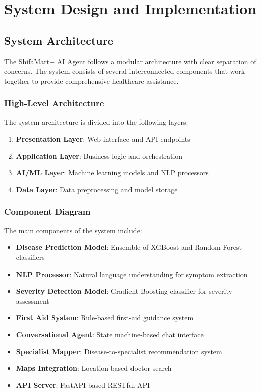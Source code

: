 \chapter{System Design and Implementation}

\section{System Architecture}
The ShifaMart+ AI Agent follows a modular architecture with clear separation of concerns. The system consists of several interconnected components that work together to provide comprehensive healthcare assistance.

\subsection{High-Level Architecture}
The system architecture is divided into the following layers:

\begin{enumerate}
    \item \textbf{Presentation Layer}: Web interface and API endpoints
    \item \textbf{Application Layer}: Business logic and orchestration
    \item \textbf{AI/ML Layer}: Machine learning models and NLP processors
    \item \textbf{Data Layer}: Data preprocessing and model storage
\end{enumerate}

\subsection{Component Diagram}
The main components of the system include:

\begin{itemize}
    \item \textbf{Disease Prediction Model}: Ensemble of XGBoost and Random Forest classifiers
    \item \textbf{NLP Processor}: Natural language understanding for symptom extraction
    \item \textbf{Severity Detection Model}: Gradient Boosting classifier for severity assessment
    \item \textbf{First Aid System}: Rule-based first-aid guidance system
    \item \textbf{Conversational Agent}: State machine-based chat interface
    \item \textbf{Specialist Mapper}: Disease-to-specialist recommendation system
    \item \textbf{Maps Integration}: Location-based doctor search
    \item \textbf{API Server}: FastAPI-based RESTful API
\end{itemize}

